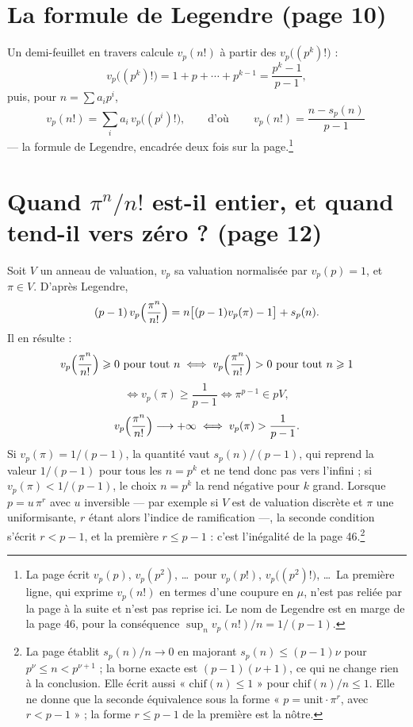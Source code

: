 \documentclass[11pt,a4paper]{article}
\begin{document}
\section*{La formule de Legendre (page 10)}

Un demi-feuillet en travers calcule $v_p(n!)$ à partir des $v_p\bigl((p^{k})!
\bigr)$ :
\[
v_p\bigl((p^{k})!\bigr) = 1 + p + \cdots + p^{k-1} = \frac{p^{k}-1}{p-1},
\]
puis, pour $n = \sum a_i p^{i}$,
\[
v_p(n!) = \sum_i a_i\, v_p\bigl((p^{i})!\bigr), \qquad \text{d'où} \qquad
\boxed{\ v_p(n!) = \frac{n - s_p(n)}{p-1}\ }
\]
— la formule de Legendre, encadrée deux fois sur la page.\footnote{La page
écrit $v_p(p)$, $v_p(p^{2})$, \ldots\ pour $v_p(p!)$, $v_p\bigl((p^{2})!\bigr)$,
\ldots\ La première ligne, qui exprime $v_p(n!)$ en termes d'une coupure en
$\mu$, n'est pas reliée par la page à la suite et n'est pas reprise ici. Le
nom de Legendre est en marge de la page 46, pour la conséquence
$\sup_n v_p(n!)/n = 1/(p-1)$.}

\section*{Quand $\pi^{n}/n!$ est-il entier, et quand tend-il vers zéro ? (page 12)}

Soit $V$ un anneau de valuation, $v_p$ sa valuation normalisée par
$v_p(p) = 1$, et $\pi \in V$. D'après Legendre,
\[
(p-1)\, v_p\Bigl(\frac{\pi^{n}}{n!}\Bigr) = n\bigl[(p-1)v_p(\pi) - 1\bigr]
+ s_p(n).
\]
Il en résulte :
\[
v_p\Bigl(\frac{\pi^{n}}{n!}\Bigr) \geqslant 0 \ \text{pour tout } n
\iff v_p\Bigl(\frac{\pi^{n}}{n!}\Bigr) > 0 \ \text{pour tout } n \geqslant 1
\]
\[
\iff v_p(\pi) \geqslant \frac{1}{p-1}
\iff \pi^{p-1} \in pV ,
\]
\[
v_p\Bigl(\frac{\pi^{n}}{n!}\Bigr) \longrightarrow +\infty
\iff v_p(\pi) > \frac{1}{p-1} .
\]
Si $v_p(\pi) = 1/(p-1)$, la quantité vaut $s_p(n)/(p-1)$, qui reprend la
valeur $1/(p-1)$ pour tous les $n = p^{k}$ et ne tend donc pas vers
l'infini ; si $v_p(\pi) < 1/(p-1)$, le choix $n = p^{k}$ la rend négative
pour $k$ grand. Lorsque $p = u\,\pi^{r}$ avec $u$ inversible — par exemple
si $V$ est de valuation discrète et $\pi$ une uniformisante, $r$ étant
alors l'indice de ramification —, la seconde condition s'écrit
$r < p - 1$, et la première $r \leqslant p-1$ : c'est l'inégalité de la page
46.\footnote{La page établit $s_p(n)/n \to 0$ en majorant
$s_p(n) \leqslant (p-1)\nu$ pour $p^{\nu} \leqslant n < p^{\nu+1}$ ; la
borne exacte est $(p-1)(\nu+1)$, ce qui ne change rien à la conclusion. Elle
écrit aussi « $\mathrm{chif}(n) \leqslant 1$ » pour $\mathrm{chif}(n)/n
\leqslant 1$. Elle ne donne que la seconde équivalence sous la forme « $p =
\text{unit}\cdot\pi^{r}$, avec $r < p-1$ » ; la forme $r \leqslant p-1$ de la
première est la nôtre.}
\end{document}
